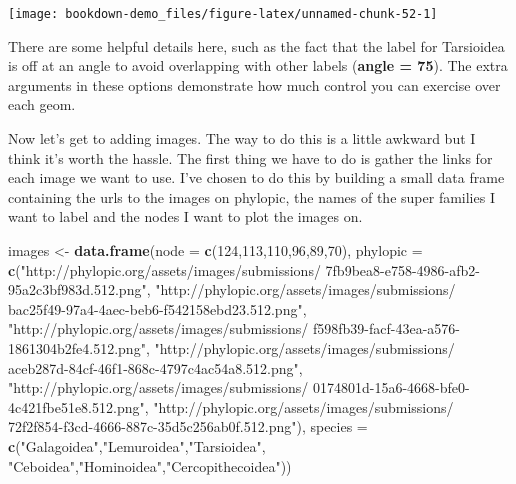 \documentclass[
]{book}
\newenvironment{Shaded}{\begin{snugshade}}{\end{snugshade}}
\newcommand{\DataTypeTok}[1]{\textcolor[rgb]{0.13,0.29,0.53}{#1}}
\newcommand{\DecValTok}[1]{\textcolor[rgb]{0.00,0.00,0.81}{#1}}
\newcommand{\KeywordTok}[1]{\textcolor[rgb]{0.13,0.29,0.53}{\textbf{#1}}}
\newcommand{\NormalTok}[1]{#1}
\newcommand{\StringTok}[1]{\textcolor[rgb]{0.31,0.60,0.02}{#1}}
\begin{document}
\begin{center}\texttt{[image: bookdown-demo\_files/figure-latex/unnamed-chunk-52-1]} \end{center}

There are some helpful details here, such as the fact that the label for Tarsioidea is off at an angle to avoid overlapping with other labels (\textbf{angle = 75}). The extra arguments in these options demonstrate how much control you can exercise over each geom.

Now let's get to adding images. The way to do this is a little awkward but I think it's worth the hassle. The first thing we have to do is gather the links for each image we want to use. I've chosen to do this by building a small data frame containing the urls to the images on phylopic, the names of the super families I want to label and the nodes I want to plot the images on.

\begin{Shaded}
\begin{Highlighting}[]
\NormalTok{images \textless{}{-}}\StringTok{ }\KeywordTok{data.frame}\NormalTok{(}\DataTypeTok{node =} \KeywordTok{c}\NormalTok{(}\DecValTok{124}\NormalTok{,}\DecValTok{113}\NormalTok{,}\DecValTok{110}\NormalTok{,}\DecValTok{96}\NormalTok{,}\DecValTok{89}\NormalTok{,}\DecValTok{70}\NormalTok{),}
\DataTypeTok{phylopic =} \KeywordTok{c}\NormalTok{(}\StringTok{"http://phylopic.org/assets/images/submissions/}
\StringTok{7fb9bea8{-}e758{-}4986{-}afb2{-}95a2c3bf983d.512.png"}\NormalTok{,}
\StringTok{"http://phylopic.org/assets/images/submissions/}
\StringTok{bac25f49{-}97a4{-}4aec{-}beb6{-}f542158ebd23.512.png"}\NormalTok{,}
\StringTok{"http://phylopic.org/assets/images/submissions/}
\StringTok{f598fb39{-}facf{-}43ea{-}a576{-}1861304b2fe4.512.png"}\NormalTok{,}
\StringTok{"http://phylopic.org/assets/images/submissions/}
\StringTok{aceb287d{-}84cf{-}46f1{-}868c{-}4797c4ac54a8.512.png"}\NormalTok{,}
\StringTok{"http://phylopic.org/assets/images/submissions/}
\StringTok{0174801d{-}15a6{-}4668{-}bfe0{-}4c421fbe51e8.512.png"}\NormalTok{,}
\StringTok{"http://phylopic.org/assets/images/submissions/}
\StringTok{72f2f854{-}f3cd{-}4666{-}887c{-}35d5c256ab0f.512.png"}\NormalTok{),}
\DataTypeTok{species =} \KeywordTok{c}\NormalTok{(}\StringTok{"Galagoidea"}\NormalTok{,}\StringTok{"Lemuroidea"}\NormalTok{,}\StringTok{"Tarsioidea"}\NormalTok{,}
\StringTok{"Ceboidea"}\NormalTok{,}\StringTok{"Hominoidea"}\NormalTok{,}\StringTok{"Cercopithecoidea"}\NormalTok{))}
\end{Highlighting}
\end{Shaded}
\end{document}
